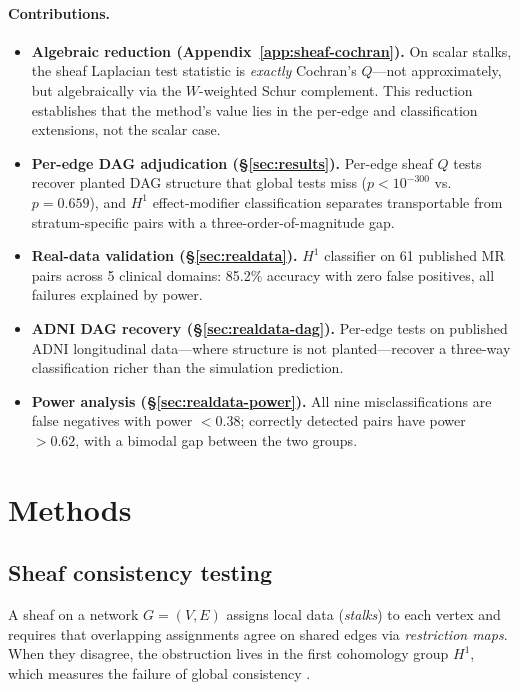 \documentclass[11pt]{article}
\begin{document}
\paragraph{Contributions.}
\begin{itemize}
\item \textbf{Algebraic reduction (Appendix~\ref{app:sheaf-cochran}).} On scalar stalks, the sheaf Laplacian test statistic is \emph{exactly} Cochran's $Q$---not approximately, but algebraically via the $W$-weighted Schur complement. This reduction establishes that the method's value lies in the per-edge and classification extensions, not the scalar case.
\item \textbf{Per-edge DAG adjudication (\S\ref{sec:results}).} Per-edge sheaf $Q$ tests recover planted DAG structure that global tests miss ($p < 10^{-300}$ vs.\ $p = 0.659$), and $H^1$ effect-modifier classification separates transportable from stratum-specific pairs with a three-order-of-magnitude gap.
\item \textbf{Real-data validation (\S\ref{sec:realdata}).} $H^1$ classifier on 61 published MR pairs across 5 clinical domains: 85.2\% accuracy with zero false positives, all failures explained by power.
\item \textbf{ADNI DAG recovery (\S\ref{sec:realdata-dag}).} Per-edge tests on published ADNI longitudinal data---where structure is not planted---recover a three-way classification richer than the simulation prediction.
\item \textbf{Power analysis (\S\ref{sec:realdata-power}).} All nine misclassifications are false negatives with power $< 0.38$; correctly detected pairs have power $> 0.62$, with a bimodal gap between the two groups.
\end{itemize}

\section{Methods}
\label{sec:methods}

\subsection{Sheaf consistency testing}
\label{sec:meth-sheaf}

A sheaf on a network $G = (V, E)$ assigns local data (\emph{stalks}) to each vertex and requires that overlapping assignments agree on shared edges via \emph{restriction maps}.
When they disagree, the obstruction lives in the first cohomology group $H^1$, which measures the failure of global consistency \citep{curry2014sheaves, robinson2014topological}.
\end{document}
